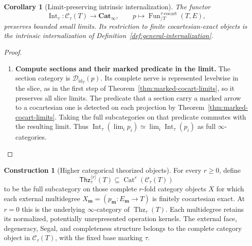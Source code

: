 \documentclass[oneside]{article}
\theoremstyle{plain}
\newtheorem{corollary}[theorem]{Corollary}
\theoremstyle{definition}
\newtheorem{construction}[theorem]{Construction}
\theoremstyle{remark}
\newcommand{\Cat}{\mathbf{Cat}_{\infty}}
\newcommand{\Fun}{\operatorname{Fun}}
\newcommand{\Int}{\operatorname{Int}}
\newcommand{\Thz}{\operatorname{Thz}}
\newcommand{\coc}{\mathrm{cocart}}
\newcommand{\id}{\operatorname{id}}
\begin{document}
\begin{corollary}[Limit-preserving intrinsic internalization]
\label{cor:intrinsic-internalization-limits}
The functor
\[
 \Int_\tau:\mathscr C_\tau(T)\longrightarrow\Cat,
 \qquad p\longmapsto\Fun_{/T}^{\tau\text{-}\coc}(T,E),
\]
preserves bounded small limits. Its restriction to finite
cocartesian-exact objects is the intrinsic internalization of
Definition~\ref{def:general-internalization}.
\end{corollary}
\begin{proof}
\leavevmode
\begin{enumerate}
\item \textbf{Compute sections and their marked predicate in the limit.}
The section category is $\mathcal D_{\id_T}(p)$.
Its complete nerve is represented levelwise in the slice, as in the
first step of Theorem~\ref{thm:marked-cocart-limits}, so it preserves
all slice limits. The predicate that a section
carry a marked arrow to a cocartesian one is detected on each
projection by Theorem~\ref{thm:marked-cocart-limits}. Taking the full
subcategories on that predicate commutes with the resulting limit.
Thus $\Int_\tau(\lim_i p_i)\simeq\lim_i\Int_\tau(p_i)$ as
full $\infty$-categories.
\qedhere
\end{enumerate}
\end{proof}

\begin{construction}[Higher categorical theorized objects]
\label{con:higher-unrepresented-strata}
For every $r\geq0$, define
\begin{equation}\label{eq:higher-unrepresented-strata}
 \mathsf{Thz}^{\langle r\rangle}_\tau(T)
 \subseteq\operatorname{Cat}^r(\mathscr C_\tau(T))
\end{equation}
to be the full subcategory on those complete $r$-fold category objects
$X$ for which each external multidegree
$X_{\mathbf m}=(p_{\mathbf m}:E_{\mathbf m}\to T)$
is finitely cocartesian exact. At $r=0$ this is the underlying
$\infty$-category of $\Thz_\tau(T)$.
Each multidegree retains its normalized, potentially unrepresented
operation kernels. The external face, degeneracy, Segal, and
completeness structure belongs to the complete category object in
$\mathscr C_\tau(T)$, with the fixed base marking $\tau$.
\end{construction}
\end{document}
